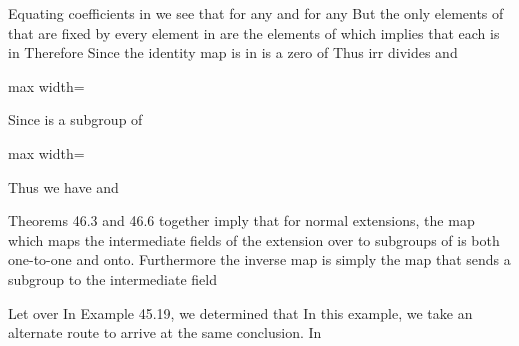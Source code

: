 \documentclass[11pt,oneside]{article}
\begin{document}
\begin{BookBody}
\noindent Equating coefficients in  we see that for any  and for any   But the only elements of  that are fixed by every element in  are the elements of  which implies that each  is in  Therefore Since the identity map is in  is a zero of  Thus irr divides  and

\begin{center}\begin{adjustbox}{max width=\linewidth}\end{adjustbox}\end{center}

\noindent Since  is a subgroup of 

\begin{center}\begin{adjustbox}{max width=\linewidth}\end{adjustbox}\end{center}

\noindent Thus we have  and  \BookEnd{\blacklozenge}

Theorems 46.3 and 46.6 together imply that for normal extensions, the map \BookInline{\lambda,\allowbreak } which maps the intermediate fields of the extension  over  to subgroups of  is both one-to-one and onto. Furthermore the inverse map  is simply the map that sends a subgroup  to the intermediate field 

 Let  over  In Example 45.19, we determined that  In this example, we take an alternate route to arrive at the same conclusion. In

\end{BookBody}
\end{document}

